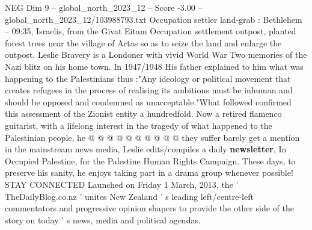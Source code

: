 \begin{textsample}{NEG Dim 9 – global\_north\_2023\_12 – Score -3.00 – global\_north\_2023\_12/103988793.txt}
Occupation settler land-grab : Bethlehem -- 09:35, Israelis, from the Givat Eitam Occupation settlement outpost, planted forest trees near the village of Artas so as to seize the land and enlarge the outpost.
Leslie Bravery is a Londoner with vivid World War Two memories of the Nazi blitz on his home town.
In 1947/1948 His father explained to him what was happening to the Palestinians thus :"Any ideology or political movement that creates refugees in the process of realising its ambitions must be inhuman and should be opposed and condemned as unacceptable."What followed confirmed this assessment of the Zionist entity a hundredfold.
Now a retired flamenco guitarist, with a lifelong interest in the tragedy of what happened to the Palestinian people, he @ @ @ @ @ @ @ @ @ @ they suffer barely get a mention in the mainstream news media, Leslie edits/compiles a daily \textbf{newsletter}, In Occupied Palestine, for the Palestine Human Rights Campaign.
These days, to preserve his sanity, he enjoys taking part in a drama group whenever possible!
STAY CONNECTED Launched on Friday 1 March, 2013, the ' TheDailyBlog.co.nz ' unites New Zealand ' s leading left/centre-left commentators and progressive opinion shapers to provide the other side of the story on today ' s news, media and political agendas.

\end{textsample}
